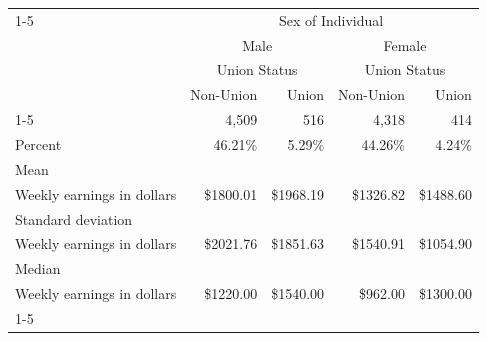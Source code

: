 \documentclass{article}
\begin{document}
\begin{table}[!h]
\centering
\begin{tabular}{lllll}
\cline{1-5}
\multicolumn{1}{c}{} &
  \multicolumn{4}{|c}{Sex of Individual} \\
\multicolumn{1}{c}{} &
  \multicolumn{2}{|c}{Male} &
  \multicolumn{2}{c}{Female} \\
\multicolumn{1}{c}{} &
  \multicolumn{2}{|c}{Union Status} &
  \multicolumn{2}{c}{Union Status} \\
\multicolumn{1}{c}{} &
  \multicolumn{1}{|r}{Non-Union} &
  \multicolumn{1}{r}{Union} &
  \multicolumn{1}{r}{Non-Union} &
  \multicolumn{1}{r}{Union} \\
\cline{1-5}
\multicolumn{1}{l}{Frequency} &
  \multicolumn{1}{|r}{4,509} &
  \multicolumn{1}{r}{516} &
  \multicolumn{1}{r}{4,318} &
  \multicolumn{1}{r}{414} \\
\multicolumn{1}{l}{Percent} &
  \multicolumn{1}{|r}{46.21\%} &
  \multicolumn{1}{r}{5.29\%} &
  \multicolumn{1}{r}{44.26\%} &
  \multicolumn{1}{r}{4.24\%} \\
\multicolumn{1}{l}{Mean} &
  \multicolumn{1}{|r}{} &
  \multicolumn{1}{r}{} &
  \multicolumn{1}{r}{} &
  \multicolumn{1}{r}{} \\
\multicolumn{1}{l}{\hspace{1em}Weekly earnings in dollars} &
  \multicolumn{1}{|r}{\$1800.01} &
  \multicolumn{1}{r}{\$1968.19} &
  \multicolumn{1}{r}{\$1326.82} &
  \multicolumn{1}{r}{\$1488.60} \\
\multicolumn{1}{l}{Standard deviation} &
  \multicolumn{1}{|r}{} &
  \multicolumn{1}{r}{} &
  \multicolumn{1}{r}{} &
  \multicolumn{1}{r}{} \\
\multicolumn{1}{l}{\hspace{1em}Weekly earnings in dollars} &
  \multicolumn{1}{|r}{\$2021.76} &
  \multicolumn{1}{r}{\$1851.63} &
  \multicolumn{1}{r}{\$1540.91} &
  \multicolumn{1}{r}{\$1054.90} \\
\multicolumn{1}{l}{Median} &
  \multicolumn{1}{|r}{} &
  \multicolumn{1}{r}{} &
  \multicolumn{1}{r}{} &
  \multicolumn{1}{r}{} \\
\multicolumn{1}{l}{\hspace{1em}Weekly earnings in dollars} &
  \multicolumn{1}{|r}{\$1220.00} &
  \multicolumn{1}{r}{\$1540.00} &
  \multicolumn{1}{r}{\$962.00} &
  \multicolumn{1}{r}{\$1300.00} \\
\cline{1-5}
\end{tabular}
\end{table}
\end{document}
